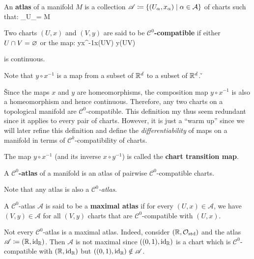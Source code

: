 \bd [Atlas]
An \textbf{atlas} of a manifold $M$ is a collection $\mathscr{A} \coloneqq \{(U_\alpha,x_\alpha)\mid \alpha \in \mathcal{A}\}$ of
charts such that:
\bse
\bigcup_{\a \in {}}U_\a = M
\ese
\ed

Two charts $(U,x)$ and $(V,y)$ are said to be \textbf{$\mathcal{C}^0$-compatible} if either $U \cap V = \varnothing$ or the map:
\bse
y\circ x^{-1}\cl x(U\cap V) \to y(U\cap V)
\ese

is continuous.
\ed

Note that $y\circ x^{-1}$ is a map from a subset of $\mathbb{R}^d$ to a subset of $\mathbb{R}^d$. \v

\bse
{}
\ese

\v

Since the maps $x$ and $y$ are homeomorphisms, the composition map $y \circ x^{-1}$ is also a homeomorphism and hence
continuous. Therefore, any two charts on a topological manifold are $\mathcal{C}^0$-compatible. This definition my
thus seem redundant since it applies to every pair of charts. However, it is just a ``warm up'' since we will later
refine this definition and define the \emph{differentiability} of maps on a manifold in terms of
$\mathcal{C}^k$-compatibility of charts.

The map $y\circ x^{-1}$ (and its inverse $x\circ y^{-1}$) is called the \textbf{chart transition map}.
\ed

A \textbf{$\mathcal{C}^0$-atlas} of a manifold is an atlas of pairwise $\mathcal{C}^0$-compatible charts.
\ed

Note that any atlas is also a \emph{$\mathcal{C}^0$-atlas}.

A $\mathcal{C}^0$-atlas $\mathscr{A}$ is said to be a \textbf{maximal atlas} if for every $(U,x)\in\mathscr{A}$, we
have $(V,y)\in\mathscr{A}$ for all $(V,y)$ charts that are $\mathcal{C}^0$-compatible with $(U,x)$.
\ed

\be
Not every $\mathcal{C}^0$-atlas is a maximal atlas. Indeed, consider $(\mathbb{R},\mathcal{O}_\mathrm{std})$ and the atlas
$\mathscr{A} \coloneqq (\mathbb{R},\operatorname{id}_{\mathbb{R}})$. Then $\mathscr{A}$ is not maximal since $((0,1),\operatorname{id}_{\mathbb{R}})$ is a chart which is
$\mathcal{C}^0$-compatible with $(\mathbb{R},\operatorname{id}_{\mathbb{R}})$ but $((0,1),\operatorname{id}_{\mathbb{R}}) \notin \mathscr{A}$.
\ee

